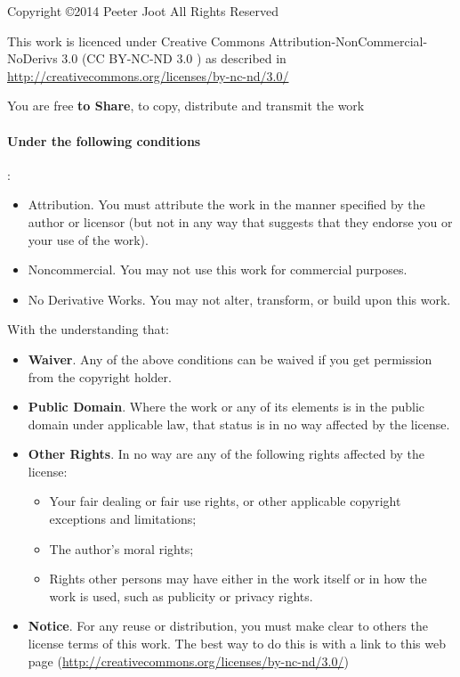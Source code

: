 Copyright \copyright 2014 Peeter Joot
All Rights Reserved

This work is licenced under Creative Commons Attribution-NonCommercial-NoDerivs 3.0 (CC BY-NC-ND 3.0 \ccbyncnd) as described in \href{http://creativecommons.org/licenses/by-nc-nd/3.0/}{http://creativecommons.org/licenses/by-nc-nd/3.0/}

You are free \textbf{to Share}, to copy, distribute and transmit the work

\paragraph{Under the following conditions}:

\begin{itemize}
\item \ccAttribution Attribution.  You must attribute the work in the manner specified by the author or licensor (but not in any way that suggests that they endorse you or your use of the work).
\item \ccNonCommercial Noncommercial. You may not use this work for commercial purposes.
\item \ccNoDerivatives No Derivative Works. You may not alter, transform, or build upon this work.
\end{itemize}

With the understanding that:

\begin{itemize}
\item \textbf{Waiver}. Any of the above conditions can be waived if you get permission from the copyright holder.
\item \textbf{Public Domain}. Where the work or any of its elements is in the public domain under applicable law, that status is in no way affected by the license.
\item \textbf{Other Rights}. In no way are any of the following rights affected by the license:

\begin{itemize}
\item Your fair dealing or fair use rights, or other applicable copyright exceptions and limitations;
\item The author's moral rights;
\item Rights other persons may have either in the work itself or in how the work is used, such as publicity or privacy rights.
\end{itemize}

\item \textbf{Notice}. For any reuse or distribution, you must make clear to others the license terms of this work. The best way to do this is with a link to this web page (\href{http://creativecommons.org/licenses/by-nc-nd/3.0/}{http://creativecommons.org/licenses/by-nc-nd/3.0/})
\end{itemize}
